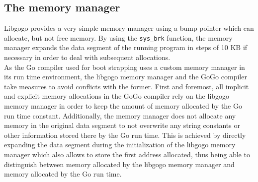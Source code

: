 \documentclass[a4paper]{scrartcl}
\let\section\subsection
\let\subsection\subsubsection
\let\subsubsection\paragraph
\let\paragraph\subparagraph
\let\subparagraph\undefined
\begin{document}
    \section{The memory manager}
      Libgogo provides a very simple memory manager using a bump pointer which can allocate, but not free memory. By using the \texttt{sys\_brk}\cite{var97} function, the memory manager expands the data segment of the running program in steps of 10 KB if necessary in order to deal with subsequent allocations.\\
      As the Go compiler used for boot strapping uses a custom memory manager in its run time environment, the libgogo memory manager and the GoGo compiler take measures to avoid conflicts with the former. First and foremost, all implicit and explicit memory allocations in the GoGo compiler rely on the libgogo memory manager in order to keep the amount of memory allocated by the Go run time constant. Additionally, the memory manager does not allocate any memory in the original data segment to not overwrite any string constants or other information stored there by the Go run time. This is achieved by directly expanding the data segment during the initialization of the libgogo memory manager which also allows to store the first address allocated, thus being able to distinguish between memory allocated by the libgogo memory manager and memory allocated by the Go run time.
\end{document}
